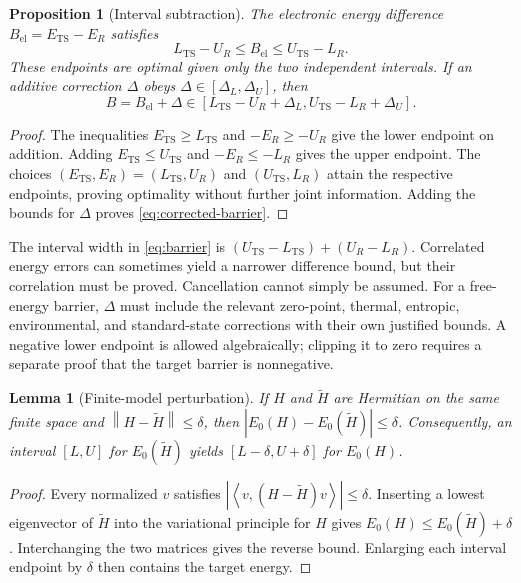 \documentclass[11pt,a4paper]{article}
\theoremstyle{plain}
\newtheorem{lemma}[theorem]{Lemma}
\newtheorem{proposition}[theorem]{Proposition}
\theoremstyle{definition}
\theoremstyle{remark}
\newcommand{\norm}[1]{\left\lVert #1\right\rVert}
\newcommand{\ip}[2]{\left\langle #1,#2\right\rangle}
\begin{document}
\begin{proposition}[Interval subtraction]
\label{prop:barrier}
The electronic energy difference $B_{\mathrm{el}}=E_{\mathrm{TS}}-E_R$
satisfies
\begin{equation}
 L_{\mathrm{TS}}-U_R\le B_{\mathrm{el}}
 \le U_{\mathrm{TS}}-L_R.
 \label{eq:barrier}
\end{equation}
These endpoints are optimal given only the two independent intervals.
If an additive correction $\Delta$ obeys
$\Delta\in[\Delta_L,\Delta_U]$, then
\begin{equation}
 B=B_{\mathrm{el}}+\Delta\in
 [L_{\mathrm{TS}}-U_R+\Delta_L,
  U_{\mathrm{TS}}-L_R+\Delta_U].
 \label{eq:corrected-barrier}
\end{equation}
\end{proposition}
\begin{proof}
The inequalities $E_{\mathrm{TS}}\ge L_{\mathrm{TS}}$ and
$-E_R\ge-U_R$ give the lower endpoint on addition. Adding
$E_{\mathrm{TS}}\le U_{\mathrm{TS}}$ and $-E_R\le-L_R$ gives the
upper endpoint. The choices $(E_{\mathrm{TS}},E_R)=
(L_{\mathrm{TS}},U_R)$ and $(U_{\mathrm{TS}},L_R)$ attain the respective
endpoints, proving optimality without further joint information. Adding the
bounds for $\Delta$ proves \eqref{eq:corrected-barrier}.
\end{proof}

The interval width in \eqref{eq:barrier} is
$(U_{\mathrm{TS}}-L_{\mathrm{TS}})+(U_R-L_R)$.
Correlated energy errors can sometimes yield a narrower difference bound,
but their correlation must be proved. Cancellation cannot simply be assumed.
For a free-energy barrier, $\Delta$ must include the relevant zero-point,
thermal, entropic, environmental, and standard-state corrections with their
own justified bounds. A negative lower endpoint is allowed algebraically;
clipping it to zero requires a separate proof that the target barrier is
nonnegative.

\begin{lemma}[Finite-model perturbation]
\label{lem:perturbation}
If $H$ and $\widetilde H$ are Hermitian on the same finite space and
$\norm{H-\widetilde H}\le\delta$, then
$|E_0(H)-E_0(\widetilde H)|\le\delta$. Consequently, an interval
$[L,U]$ for $E_0(\widetilde H)$ yields $[L-\delta,U+\delta]$ for
$E_0(H)$.
\end{lemma}
\begin{proof}
Every normalized $v$ satisfies
$|\ip{v}{(H-\widetilde H)v}|\le\delta$. Inserting a lowest eigenvector
of $\widetilde H$ into the variational principle for $H$ gives
$E_0(H)\le E_0(\widetilde H)+\delta$. Interchanging the two matrices
gives the reverse bound. Enlarging each interval endpoint by $\delta$
then contains the target energy.
\end{proof}
\end{document}
